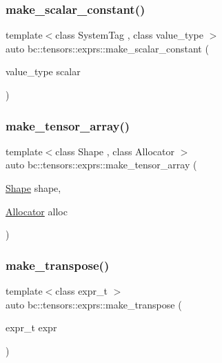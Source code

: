 \subsubsection{\texorpdfstring{make\+\_\+scalar\+\_\+constant()}{make\_scalar\_constant()}}
{\footnotesize\ttfamily template$<$class System\+Tag , class value\+\_\+type $>$ \\
auto bc\+::tensors\+::exprs\+::make\+\_\+scalar\+\_\+constant (\begin{DoxyParamCaption}\item[{value\+\_\+type}]{scalar }\end{DoxyParamCaption})}

\mbox{\label{namespacebc_1_1tensors_1_1exprs_a103027856cc2ea715f683a584c14a97e}} 
\subsubsection{\texorpdfstring{make\+\_\+tensor\+\_\+array()}{make\_tensor\_array()}}
{\footnotesize\ttfamily template$<$class Shape , class Allocator $>$ \\
auto bc\+::tensors\+::exprs\+::make\+\_\+tensor\+\_\+array (\begin{DoxyParamCaption}\item[{\hyperlink{structbc_1_1Shape}{Shape}}]{shape,  }\item[{\hyperlink{classbc_1_1allocators_1_1Allocator}{Allocator}}]{alloc }\end{DoxyParamCaption})}

\mbox{\label{namespacebc_1_1tensors_1_1exprs_ae190e4e61e8d5caaaa750e65942d9052}} 
\subsubsection{\texorpdfstring{make\+\_\+transpose()}{make\_transpose()}\hspace{0.1cm}{\footnotesize\ttfamily [1/2]}}
{\footnotesize\ttfamily template$<$class expr\+\_\+t $>$ \\
auto bc\+::tensors\+::exprs\+::make\+\_\+transpose (\begin{DoxyParamCaption}\item[{expr\+\_\+t}]{expr }\end{DoxyParamCaption})}


